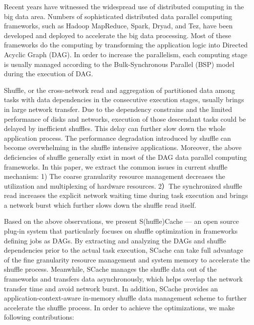 \begin{englishabstract}

Recent years have witnessed the widespread use of distributed computing in the big data area.
Numbers of sophisticated distributed data parallel computing frameworks, such as Hadoop MapReduce\cite{hadoop}, Spark\cite{apachespark}, Dryad\cite{dryad}, and Tez\cite{tez},
have been developed and deployed to accelerate the big data processing.
Most of these frameworks do the computing by transforming the application logic into Directed Acyclic Graph (DAG).
In order to increase the parallelism, each computing stage is usually managed according to the Bulk-Synchronous Parallel (BSP) model during the execution of DAG.

Shuffle, or the cross-network read and aggregation of partitioned data among tasks with data dependencies in the consecutive execution stages, 
usually brings in large network transfer. 
Due to the dependency constrains and the limited performance of disks and networks, execution of those descendant tasks could be delayed by inefficient shuffles. 
This delay can further slow down the whole application process. 
The performance degradation introduced by shuffle can become overwhelming in the shuffle intensive applications.
Moreover, the above deficiencies of shuffle generally exist in most of the DAG data parallel computing frameworks. 
In this paper, we extract the common issues in current shuffle mechanism: 
1) The coarse granularity resource management decreases the utilization and multiplexing of hardware resources.
2）The synchronized shuffle read increases the explicit network waiting time during task execution and brings a network burst which further slows down the shuffle read itself.

Based on the above observations, we present S(huffle)Cache --- an open source plug-in system that particularly focuses on shuffle optimization in frameworks defining jobs as DAGs. 
By extracting and analyzing the DAGs and shuffle dependencies prior to the actual task execution, 
SCache can take full advantage of the fine granularity resource management and system memory to accelerate the shuffle process. 
Meanwhile, SCache manages the shuffle data out of the frameworks and transfers data asynchronously, which helps overlap the network transfer time and avoid network burst.
In addition, SCache provides an application-context-aware in-memory shuffle data management scheme to further accelerate the shuffle process.  
In order to achieve the optimizations, we make following contributions:


\end{englishabstract}
